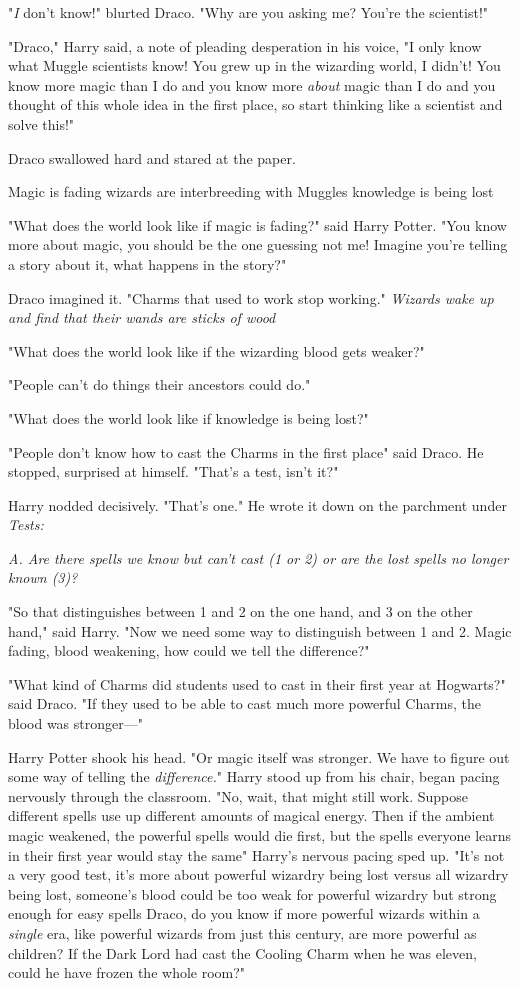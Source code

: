 "\emph{I} don't know!" blurted Draco. "Why are you asking me? You're the
scientist!"

"Draco," Harry said, a note of pleading desperation in his voice, "I only know
what Muggle scientists know! You grew up in the wizarding world, I didn't! You
know more magic than I do and you know more \emph{about} magic than I do and
you thought of this whole idea in the first place, so start thinking like a
scientist and solve this!"

Draco swallowed hard and stared at the paper.

Magic is fading{\el} wizards are interbreeding with Muggles{\el}
knowledge is being lost{\el}

"What does the world look like if magic is fading?" said Harry Potter. "You
know more about magic, you should be the one guessing not me! Imagine you're
telling a story about it, what happens in the story?"

Draco imagined it. "Charms that used to work stop working." \emph{Wizards wake
up and find that their wands are sticks of wood{\el}}

"What does the world look like if the wizarding blood gets weaker?"

"People can't do things their ancestors could do."

"What does the world look like if knowledge is being lost?"

"People don't know how to cast the Charms in the first place{\el}" said
Draco. He stopped, surprised at himself. "That's a test, isn't it?"

Harry nodded decisively. "That's one." He wrote it down on the parchment under
\emph{Tests:}

\emph{A. Are there spells we know but can't cast (1 or 2) or are the lost
spells no longer known (3)?}

"So that distinguishes between 1 and 2 on the one hand, and 3 on the other
hand," said Harry. "Now we need some way to distinguish between 1 and 2. Magic
fading, blood weakening, how could we tell the difference?"

"What kind of Charms did students used to cast in their first year at
Hogwarts?" said Draco. "If they used to be able to cast much more powerful
Charms, the blood was stronger—"

Harry Potter shook his head. "Or magic itself was stronger. We have to figure
out some way of telling the \emph{difference.}" Harry stood up from his chair,
began pacing nervously through the classroom. "No, wait, that might still work.
Suppose different spells use up different amounts of magical energy. Then if
the ambient magic weakened, the powerful spells would die first, but the spells
everyone learns in their first year would stay the same{\el}" Harry's
nervous pacing sped up. "It's not a very good test, it's more about powerful
wizardry being lost versus all wizardry being lost, someone's blood could be
too weak for powerful wizardry but strong enough for easy spells{\el} Draco,
do you know if more powerful wizards within a \emph{single} era, like powerful
wizards from just this century, are more powerful as children? If the Dark Lord
had cast the Cooling Charm when he was eleven, could he have frozen the whole
room?"

